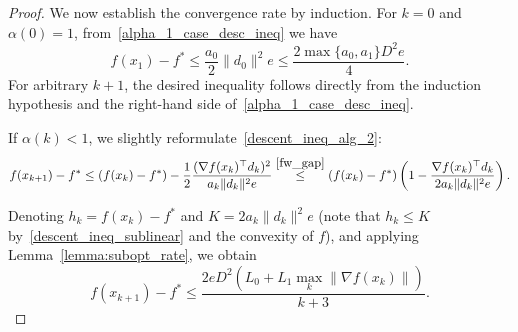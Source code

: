 \documentclass[10pt,a4paper]{amsart}
\begin{document}
\begin{proof}
		We now establish the convergence rate by induction.
		For $k=0$ and $\alpha(0)=1$, from~\eqref{alpha_1_case_desc_ineq} we have
		\[
		f(x_{1}) - f^*
		\leq \frac{a_0}{2} \|d_0\|^2 e
		\leq \frac{2 \max \{a_0, a_1\} D^2 e}{4}.
		\]
		For arbitrary $k + 1$, the desired inequality follows directly from the induction hypothesis and the right-hand side of~\eqref{alpha_1_case_desc_ineq}.
		
		If $\alpha(k) < 1$, we slightly reformulate~\eqref{descent_ineq_alg_2}:
		\[
		f(x_{k+1}) - f^*
		\leq (f(x_k) - f^*)
		- \frac{1}{2}
		\frac{(\nabla f(x_k)^\top d_k)^2}{
			a_k \|d_k\|^2 e}
		\overset{\eqref{fw_gap}}{\leq}
		(f(x_k) - f^*)
		\left(
		1 - \frac{\nabla f(x_k)^\top d_k}{
			2 a_k \|d_k\|^2 e}
		\right).
		\]
		
		Denoting $h_k = f(x_k) - f^*$ and $K = 2 a_k \|d_k\|^2 e$ (note that $h_k \leq K$ by~\eqref{descent_ineq_sublinear} and the convexity of $f$), and applying Lemma~\ref{lemma:subopt_rate}, we obtain
		\[
		f(x_{k+1}) - f^* \leq
		\frac{2eD^2 \left( L_0 + L_1 \max_k \|\nabla f(x_k)\| \right)}{k + 3}.
		\]
	\end{proof}
\end{document}
